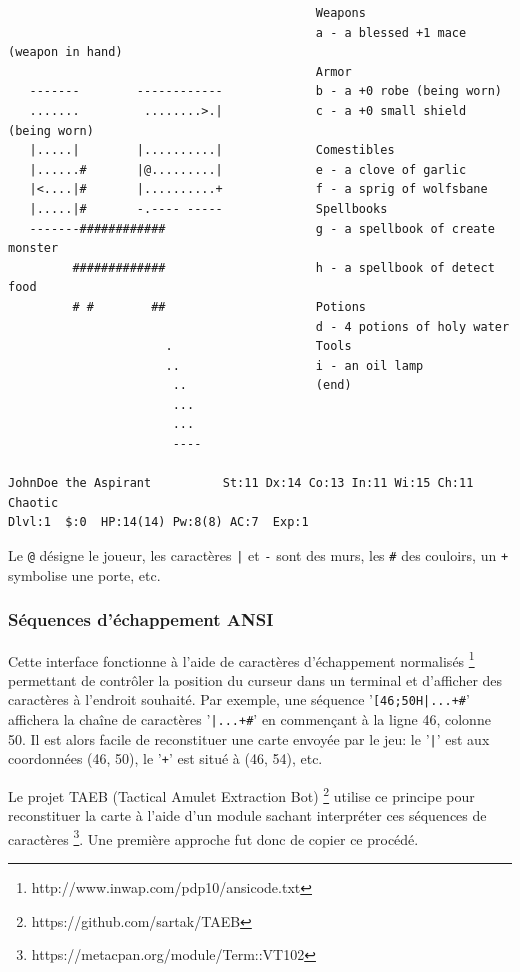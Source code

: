 \documentclass[a4paper,12pt]{article}
\begin{document}
\begin{verbatim}
                                           Weapons
                                           a - a blessed +1 mace (weapon in hand)
                                           Armor
   -------        ------------             b - a +0 robe (being worn)
   .......         ........>.|             c - a +0 small shield (being worn)
   |.....|        |..........|             Comestibles
   |......#       |@.........|             e - a clove of garlic
   |<....|#       |..........+             f - a sprig of wolfsbane
   |.....|#       -.---- -----             Spellbooks
   -------############                     g - a spellbook of create monster
         #############                     h - a spellbook of detect food
         # #        ##                     Potions
                                           d - 4 potions of holy water
                      .                    Tools
                      ..                   i - an oil lamp
                       ..                  (end) 
                       ...
                       ...
                       ----

JohnDoe the Aspirant          St:11 Dx:14 Co:13 In:11 Wi:15 Ch:11  Chaotic
Dlvl:1  $:0  HP:14(14) Pw:8(8) AC:7  Exp:1
\end{verbatim}

Le \verb!@! désigne le joueur, les caractères \verb!|! et \verb!-! sont des murs, les \verb!#! des couloirs, un \verb!+! symbolise une porte, etc.


\subsubsection*{Séquences d'échappement ANSI}

Cette interface fonctionne à l'aide de caractères d'échappement normalisés \footnote{http://www.inwap.com/pdp10/ansicode.txt} permettant de contrôler la position du curseur dans un terminal et d'afficher des caractères à l'endroit souhaité. Par exemple, une séquence '\verb![46;50H|...+#!' affichera la chaîne de caractères '\verb!|...+#!' en commençant à la ligne 46, colonne 50. Il est alors facile de reconstituer une carte envoyée par le jeu: le '\verb!|!' est aux coordonnées (46, 50), le '\verb!+!' est situé à (46, 54), etc.
	
	Le projet TAEB (Tactical Amulet Extraction Bot) \footnote{https://github.com/sartak/TAEB} utilise ce principe pour reconstituer la carte à l'aide d'un module sachant interpréter ces séquences de caractères \footnote{https://metacpan.org/module/Term::VT102}. Une première approche fut donc de copier ce procédé.
\end{document}
